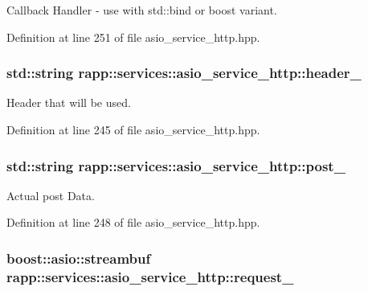 Callback Handler -\/ use with std\-::bind or boost variant. 



Definition at line 251 of file asio\-\_\-service\-\_\-http.\-hpp.

\hypertarget{classrapp_1_1services_1_1asio__service__http_ad2fbb8fb1f17c8ad6022ecbf13bc769c}{
\subsubsection[{header\-\_\-}]{\setlength{\rightskip}{0pt plus 5cm}std\-::string rapp\-::services\-::asio\-\_\-service\-\_\-http\-::header\-\_\-\hspace{0.3cm}{\ttfamily [protected]}}}\label{classrapp_1_1services_1_1asio__service__http_ad2fbb8fb1f17c8ad6022ecbf13bc769c}


Header that will be used. 



Definition at line 245 of file asio\-\_\-service\-\_\-http.\-hpp.

\hypertarget{classrapp_1_1services_1_1asio__service__http_a08e5b2c94340f528191e7840656be121}{
\subsubsection[{post\-\_\-}]{\setlength{\rightskip}{0pt plus 5cm}std\-::string rapp\-::services\-::asio\-\_\-service\-\_\-http\-::post\-\_\-\hspace{0.3cm}{\ttfamily [protected]}}}\label{classrapp_1_1services_1_1asio__service__http_a08e5b2c94340f528191e7840656be121}


Actual post Data. 



Definition at line 248 of file asio\-\_\-service\-\_\-http.\-hpp.

\hypertarget{classrapp_1_1services_1_1asio__service__http_a003a0577751d30d2370bff9a20d46746}{
\subsubsection[{request\-\_\-}]{\setlength{\rightskip}{0pt plus 5cm}boost\-::asio\-::streambuf rapp\-::services\-::asio\-\_\-service\-\_\-http\-::request\-\_\-\hspace{0.3cm}{\ttfamily [protected]}}}\label{classrapp_1_1services_1_1asio__service__http_a003a0577751d30d2370bff9a20d46746}


